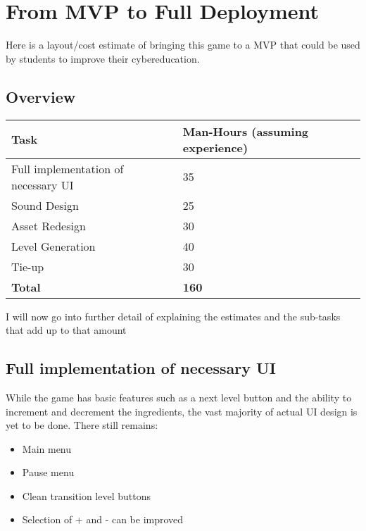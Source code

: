 \documentclass{article}
\begin{document}
\section{From MVP to Full Deployment}

Here is a layout/cost estimate of bringing this game to a MVP that
could be used by students to improve their cybereducation.

\subsection{Overview}

\begin{table}[h]
\begin{tabular}{l|l}
\textbf{Task}                       & \textbf{Man-Hours (assuming experience)} \\ \hline
Full implementation of necessary UI & 35                                                 \\ \hline
Sound Design                        & 25                                                 \\ \hline
Asset Redesign                      & 30                                              \\ \hline
Level Generation                    & 40                                                 \\ \hline
Tie-up                              & 30                                               \\ \hline
\textbf{Total}                      & \textbf{160}                                              \\ 
\end{tabular}
\end{table}

I will now go into further detail of explaining the estimates and the
sub-tasks that add up to that amount

\subsection{Full implementation of necessary UI}

While the game has basic features such as a next level button and the
ability to increment and decrement the ingredients, the vast majority
of actual UI design is yet to be done. There still remains:

\begin{itemize}
  \item Main menu
  \item Pause menu
  \item Clean transition level buttons
  \item Selection of + and - can be improved
\end{itemize}
\end{document}
